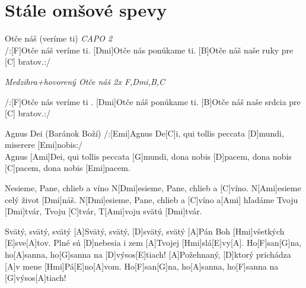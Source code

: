 \documentclass[12pt]{article}
\begin{document}
\begin{multicols}{2}
\tableofcontents
\end{multicols}

\newpage


\section{Stále omšové spevy}

\begin{songgroup}{2}

\begin{groupitem}{Otče náš (veríme ti)}
	\textit{CAPO 2}\\
	/:[F]Otče náš veríme ti.
	[Dmi]Otče nás ponúkame ti.
	[B]Otče náš naše ruky pre [C] bratov.:/
	
	\textit{Medzihra+hovorený Otče náš 
		2x F,Dmi,B,C}
	
	/:[F]Otče nás veríme ti .
	[Dmi]Otče náš ponúkame ti.
	[B]Otče náš naše srdcia pre [C] bratov.:/
\end{groupitem}

\begin{groupitem}{Agnus Dei (Baránok Boží)}
/:[Emi]Agnus De[C]i, qui tollis peccata [D]mundi, 
miserere [Emi]nobis:/
\\
[G]Agnus [Ami]Dei, qui tollis peccata [G]mundi, 
dona nobis [D]pacem, dona nobis [C]pacem,
dona nobis [Emi]pacem.
\end{groupitem}

\columnbreak

\begin{groupitem}{Nesieme, Pane, chlieb a víno}
N[Dmi]esieme, Pane, chlieb a [C]víno.
N[Ami]esieme celý život [Dmi]náš.
N[Dmi]esieme, Pane, chlieb a [C]víno
a[Ami] hľadáme Tvoju [Dmi]tvár, Tvoju [C]tvár,
T[Ami]voju svätú [Dmi]tvár.
\end{groupitem}

\begin{groupitem}{Svätý, svätý, svätý}
[A]Svätý, svätý, [D]svätý, svätý [A]Pán Boh [Hmi]všetkých [E]sve[A]tov.
Plné sú [D]nebesia i zem [A]Tvojej [Hmi]slá[E]vy[A].
Ho[F]san[G]na, ho[A]sanna, ho[G]sanna na [D]výsos[E]tiach!
[A]Požehnaný, [D]ktorý prichádza [A]v mene [Hmi]Pá[E]no[A]vom.
Ho[F]san[G]na, ho[A]sanna, ho[F]sanna na [G]výsos[A]tiach!
\end{groupitem}
\end{songgroup}
\end{document}
